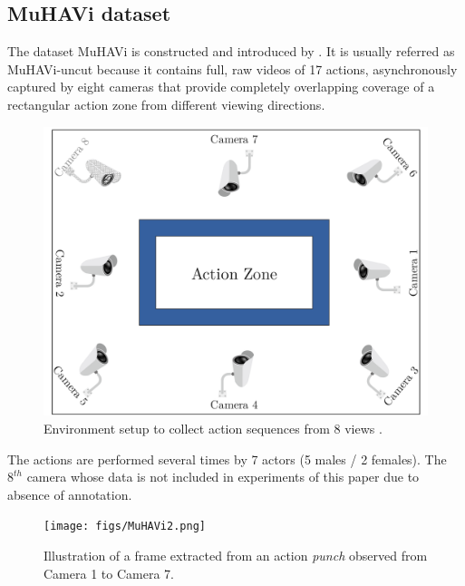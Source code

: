 
\subsection{MuHAVi dataset}
    The dataset MuHAVi is constructed and introduced by \cite{murtaza2016multi}. It is usually referred as MuHAVi-uncut because it contains full, raw videos of 17 actions, asynchronously captured by eight cameras that provide completely overlapping coverage of a rectangular action zone from different viewing directions. 
    \begin{figure}[h]
        \centering
        \includegraphics[width=0.8\linewidth]{figs/MuHAVi1.png}
        \caption{Environment setup to collect action sequences from 8 views \cite{murtaza2016multi}.}
        \label{Fig:MuHAVi1}
    \end{figure}
    The actions are performed several times by 7 actors (5 males / 2 females). 
    The $8^{th}$ camera whose data is not included in experiments of this paper due to absence of annotation.
    \begin{figure}[htbp]
        \centering
        \texttt{[image: figs/MuHAVi2.png]}
        \caption{Illustration of a frame extracted from an action \textit{punch} observed from Camera 1 to Camera 7.}
        \label{Fig:MuHAVi2}
    \end{figure}
